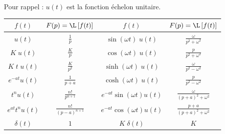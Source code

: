 Pour rappel : $u(t)$ est la fonction échelon unitaire.
\renewcommand\arraystretch{1.3}
\begin{center}
\begin{tabular}{|c|c||c|c|}
	\hline
	$f(t)$			&		$\displaystyle F(p)=\L\left[f(t)\right]$		&	$f(t)$				&	$F(p)=\L\left[f(t)\right]$			\\[0.3cm]
	\hline\hline
	$u(t)$			&		$\displaystyle \frac 1p$				&	$\sin(\omega t)\;u(t)$		&	$\displaystyle \frac{\omega}{p^2+\omega^2}$	\\[0.3cm]
	\hline
	$K\;u(t)$		&		$\displaystyle \frac{K}{p}$				&	$\cos(\omega t)\;u(t)$		&	$\displaystyle \frac{p}{p^2+\omega^2}$		\\[0.3cm]
	\hline
	$K\;t\;u(t)$		&		$\displaystyle \frac K{p^2}$				&	$\sinh(\omega t)\;u(t)$		&	$\displaystyle \frac \omega{p^2-\omega^2}$	\\[0.3cm]
	\hline
	$e^{-at}u(t)$		&		$\displaystyle \frac{1}{p+a}$				&	$\cosh(\omega t)\;u(t)$		&	$\displaystyle \frac{p}{p^2-\omega^2}$		\\[0.3cm]
	\hline
	$t^nu(t)$		&		$\displaystyle \frac{n!}{p^{n+1}}$			&	$e^{-at}\sin(\omega t)u(t)$	&	$\displaystyle \frac \omega{(p+a)^2+\omega^2}$	\\[0.3cm]
	\hline
	$e^{at} t^n u(t)$	&		$\displaystyle \frac{n!}{(p-a)^{n+1}}$			&	$e^{-at}\cos(\omega t) u(t)$	&	$\displaystyle \frac{p+a}{(p+a)^2+\omega^2}$	\\[0.3cm]
	\hline
	$\delta(t)$		&		$1$							&	$K\;\delta(t)$			&	$K$						\\[0.3cm]
	\hline
\end{tabular}
\end{center}
